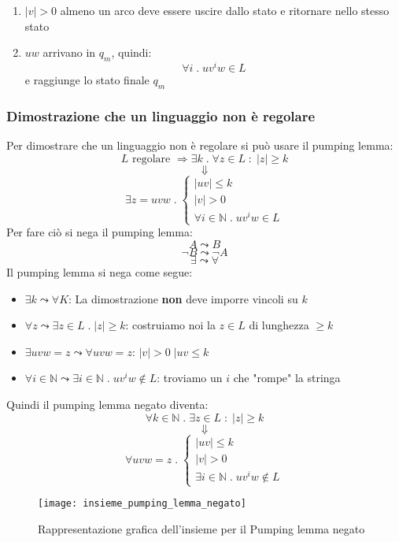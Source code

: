 \documentclass[a4paper]{article}
\begin{document}
\begin{theorem}
\begin{enumerate}
    \item \( \left| v \right| > 0 \) almeno un arco deve essere uscire dallo stato
      e ritornare nello stesso stato

    \item \( uw \) arrivano in \( q_m \), quindi:
      \[
        \forall i \;.\; uv^iw \in L
      \] 
      e raggiunge lo stato finale \( q_m \)
  \end{enumerate}
\end{theorem}

\subsubsection{Dimostrazione che un linguaggio non è regolare}
Per dimostrare che un linguaggio non è regolare si può usare il pumping lemma:
\[
  L \text{ regolare } \Rightarrow \exists k \;.\; \forall z \in L \;:\; |z| \ge k
\] 
\[
  \Downarrow
\] 
\[
  \exists z = uvw \;.\; \begin{cases}
    |uv| \le k\\
    |v| > 0\\
    \forall i \in \mathbb{N} \;.\; uv^iw \in L
  \end{cases}
\]
Per fare ciò si nega il pumping lemma:
\[
  A \leadsto B
\] 
\[
  \neg B \leadsto \neg A
\] 
\[
  \exists \leadsto \forall 
\] 
Il pumping lemma si nega come segue:
\begin{itemize}
  \item \( \exists k \leadsto \forall K \):
    La dimostrazione \textbf{non} deve imporre vincoli su \( k \)

  \item \( \forall z \leadsto \exists z \in L \;.\; \left| z \right| \ge k \):
    costruiamo noi la \( z \in L \) di lunghezza \( \ge k \) 

  \item \( \exists uvw = z \leadsto \forall uvw = z \):
    \( |v| > 0 \; |uv \le k \) 
  \item \( \forall i \in \mathbb{N} \leadsto \exists i \in \mathbb{N} \;.\; uv^iw \notin L \):
    troviamo un \( i \) che "rompe" la stringa
\end{itemize}
Quindi il pumping lemma negato diventa:
\[
  \forall k \in \mathbb{N} \;.\; \exists z \in L \;:\; |z| \ge k
\] 
\[
  \Downarrow
\] 
\[
  \forall  uvw = z \;.\; \begin{cases}
    |uv| \le k\\
    |v| > 0\\
    \exists i \in \mathbb{N} \;.\; uv^iw \notin L
  \end{cases}
\] 
\begin{figure}[H]
  \centering
  \texttt{[image: insieme\_pumping\_lemma\_negato]}
  \caption{Rappresentazione grafica dell'insieme per il Pumping lemma negato}
\end{figure}
\end{document}
